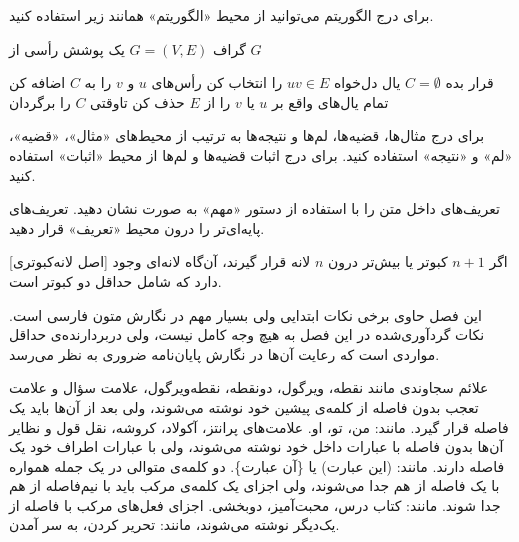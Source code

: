 
برای درج الگوریتم می‌توانید از محیط «الگوریتم» همانند زیر استفاده کنید.

 گراف $G=(V, E)$
 یک پوشش رأسی از $G$

 قرار بده $C = \emptyset$  %
 یال دل‌‌خواه $uv \in E$ را انتخاب کن
 رأس‌های $u$ و $v$ را به $C$ اضافه کن
 تمام یال‌های واقع بر $u$ یا $v$ را از $E$ حذف کن
‌تاوقتی
 $C$ را برگردان



برای درج مثال‌ها، قضیه‌ها، لم‌ها و نتیجه‌ها به ترتیب از محیط‌های
«مثال»، «قضیه»، «لم» و «نتیجه» استفاده کنید.
برای درج اثبات قضیه‌ها و لم‌ها  از محیط «اثبات» استفاده کنید.

تعریف‌های داخل متن را با استفاده از دستور «مهم» به صورت  نشان دهید.
تعریف‌های پایه‌ای‌تر را درون محیط «تعریف» قرار دهید.

[اصل لانه‌کبوتری]
اگر $n+1$ کبوتر یا بیش‌تر درون  $n$ لانه قرار گیرند، آن‌گاه لانه‌ای 
وجود دارد که شامل حداقل دو کبوتر است.





این فصل حاوی برخی نکات ابتدایی ولی بسیار مهم در نگارش متون فارسی است. 
نکات گردآوری‌شده در این فصل به‌ هیچ‌ وجه کامل نیست، 
ولی دربردارنده‌ی حداقل مواردی است که رعایت آن‌ها در نگارش پایان‌نامه ضروری به نظر می‌رسد.



علائم سجاوندی مانند نقطه، ویرگول، دونقطه، نقطه‌ویرگول، علامت سؤال و علامت تعجب %
بدون فاصله از کلمه‌ی پیشین خود نوشته می‌شوند، ولی بعد از آن‌ها باید یک فاصله‌ قرار گیرد. مانند: من، تو، او.
علامت‌های پرانتز، آکولاد، کروشه، نقل قول و نظایر آن‌ها بدون فاصله با عبارات داخل خود نوشته می‌شوند، ولی با عبارات اطراف خود یک فاصله دارند. مانند: (این عبارت) یا \{آن عبارت\}.
دو کلمه‌ی متوالی در یک جمله همواره با یک فاصله از هم جدا می‌شوند، ولی اجزای یک کلمه‌ی مرکب باید با نیم‌فاصله‌‌
 از هم جدا شوند. مانند: کتاب درس، محبت‌آمیز، دوبخشی.
 اجزای فعل‌های مرکب با فاصله از یک‌دیگر نوشته می‌شوند، مانند: تحریر کردن، به سر آمدن.


